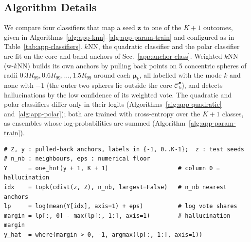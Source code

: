 \subsection{Algorithm Details}
\label{app:algo-details}

We compare four classifiers that map a seed $\boldsymbol{z}$ to one of the $K + 1$ outcomes, given
in Algorithms~\ref{alg:app-knn}--\ref{alg:app-param-train} and configured as in
Table~\ref{tab:app-classifiers}. $k$NN, the quadratic classifier and the polar classifier are fit
on the core and band anchors of Sec.~\ref{app:anchor-class}. Weighted $k$NN (w-$k$NN) builds its
own anchors by pulling back points on 5 concentric spheres of radii
$0.3R_{99}, 0.6R_{99}, \dots, 1.5R_{99}$ around each $\boldsymbol{\mu}_k$, all labelled with the mode
$k$ and none with $-1$ (the outer two spheres lie outside the core $\mathcal{C}_k^\bullet$), and
detects hallucinations by the low confidence of its weighted vote. The quadratic and polar
classifiers differ only in their logits (Algorithms~\ref{alg:app-quadratic}
and~\ref{alg:app-polar}); both are trained with cross-entropy over the $K + 1$ classes, as
ensembles whose log-probabilities are summed (Algorithm~\ref{alg:app-param-train}).

\begin{algorithm}[htbp]
\caption{$k$NN: seed $\to$ outcome.}
\label{alg:app-knn}
\begin{lstlisting}[style=appcode]
# Z, y : pulled-back anchors, labels in {-1, 0..K-1};  z : test seeds
# n_nb : neighbours, eps : numerical floor
Y      = one_hot(y + 1, K + 1)                    # column 0 = hallucination
idx    = topk(cdist(z, Z), n_nb, largest=False)   # n_nb nearest anchors
lp     = log(mean(Y[idx], axis=1) + eps)          # log vote shares
margin = lp[:, 0] - max(lp[:, 1:], axis=1)        # hallucination margin
y_hat  = where(margin > 0, -1, argmax(lp[:, 1:], axis=1))
\end{lstlisting}
\end{algorithm}


